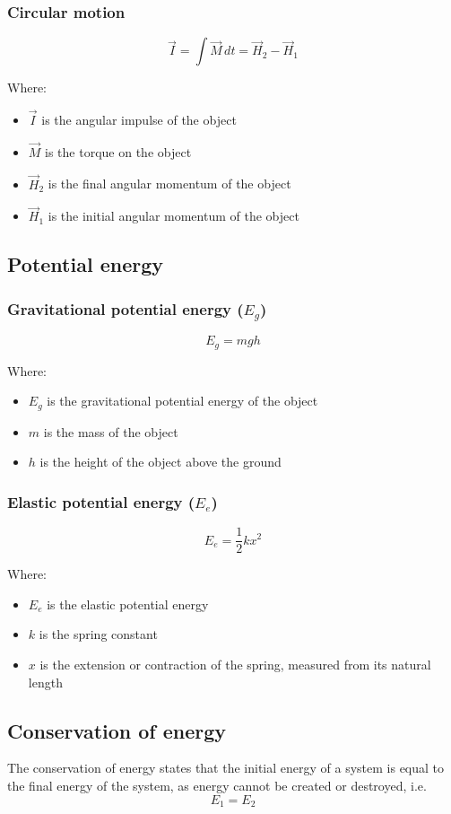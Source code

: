 \documentclass[11pt]{article}
\begin{document}
\subsubsection{Circular motion}
\label{sec:org4d16653}
\[\vec{I} = \int \vec{M} \, dt = \vec{H}_2 - \vec{H}_1\]

Where:
\begin{itemize}
\item \(\vec{I}\) is the angular impulse of the object
\item \(\vec{M}\) is the torque on the object
\item \(\vec{H}_2\) is the final angular momentum of the object
\item \(\vec{H}_1\) is the initial angular momentum of the object
\end{itemize}
\subsection{Potential energy}
\label{sec:org9d7fca2}

\subsubsection{Gravitational potential energy (\(E_g\))}
\label{sec:orgfdc6264}
\[E_g = mgh\]

Where:
\begin{itemize}
\item \(E_g\) is the gravitational potential energy of the object
\item \(m\) is the mass of the object
\item \(h\) is the height of the object above the ground
\end{itemize}
\subsubsection{Elastic potential energy (\(E_e\))}
\label{sec:org224f08c}
\[E_e = \frac{1}{2} kx^2\]

Where:
\begin{itemize}
\item \(E_e\) is the elastic potential energy
\item \(k\) is the spring constant
\item \(x\) is the extension or contraction of the spring, measured from its natural length
\end{itemize}
\subsection{Conservation of energy}
\label{sec:org0cef0de}
The conservation of energy states that the initial energy of a system is equal to the final energy of the system, as energy cannot be created or destroyed, i.e.
\[E_1 = E_2\]
\end{document}
